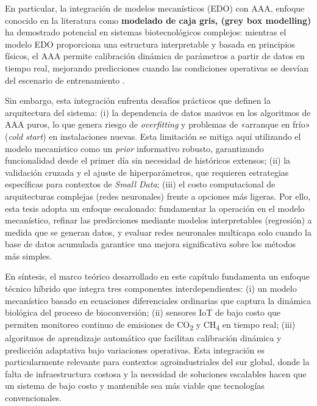 En particular, la integración de modelos mecanísticos (EDO) con AAA, enfoque conocido en la literatura como \textbf{modelado de caja gris, (grey box modelling)} ha demostrado 
potencial en sistemas biotecnológicos complejos: mientras el modelo EDO proporciona 
una estructura interpretable y basada en principios físicos, el AAA permite calibración 
dinámica de parámetros a partir de datos en tiempo real, mejorando predicciones cuando 
las condiciones operativas se desvían del escenario de entrenamiento 
\parencite{kobelskiProcessOptimizationBlack2024,guillaumeAsymptoticEstimatedDigestibility2023}. 

Sin embargo, esta integración enfrenta desafíos prácticos que definen la arquitectura del sistema: (i) la dependencia de datos masivos en los algoritmos de AAA puros, lo que genera riesgo de \textit{overfitting} y problemas de «arranque en frío» (\textit{cold start}) en instalaciones nuevas. Esta limitación se mitiga aquí utilizando el modelo mecanístico como un \textit{prior} informativo robusto, garantizando funcionalidad desde el primer día sin necesidad de históricos extensos; (ii) la validación cruzada y el ajuste de hiperparámetros, que requieren estrategias específicas para contextos de \textit{Small Data}; (iii) el costo computacional de arquitecturas complejas (redes neuronales) frente a opciones más ligeras. Por ello, esta tesis adopta un enfoque escalonado: fundamentar la operación en el modelo mecanístico, refinar las predicciones mediante modelos interpretables (regresión) a medida que se generan datos, y evaluar redes neuronales multicapa solo cuando la base de datos acumulada garantice una mejora significativa sobre los métodos más simples.

En síntesis, el marco teórico desarrollado en este capítulo fundamenta un enfoque 
técnico híbrido que integra tres componentes interdependientes: (i) un modelo mecanístico 
basado en ecuaciones diferenciales ordinarias que captura la dinámica biológica del proceso 
de bioconversión; (ii) sensores IoT de bajo costo que permiten monitoreo continuo de emisiones 
de CO\textsubscript{2} y CH\textsubscript{4} en tiempo real; (iii) algoritmos de aprendizaje 
automático que facilitan calibración dinámica y predicción adaptativa bajo variaciones 
operativas. Esta integración es particularmente relevante para contextos agroindustriales 
del sur global, donde la falta de infraestructura costosa y la necesidad de soluciones 
escalables hacen que un sistema de bajo costo y mantenible sea más viable que tecnologías 
convencionales.

